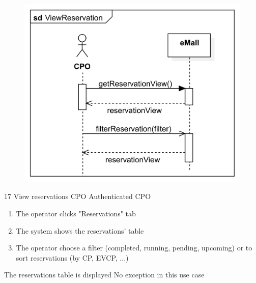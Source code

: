 \usecase
{
    \begin{figure}[H]
        \centering
        \includegraphics[scale=0.9]{src/sequence_diagram/ViewReservation.png}
    \end{figure}
}
{17}
{View reservations} %
{CPO} %
{Authenticated CPO} %
{ %
    \begin{enumerate}

        \item The operator clicks "Reservations" tab
        \item The system shows the reservations' table
        \item The operator choose a filter (completed, running, pending, upcoming) or to sort reservations (by CP, EVCP, ...)
    \end{enumerate}
}
{The reservations table is displayed} %
{ %
    No exception in this use case
}
{ %
}

